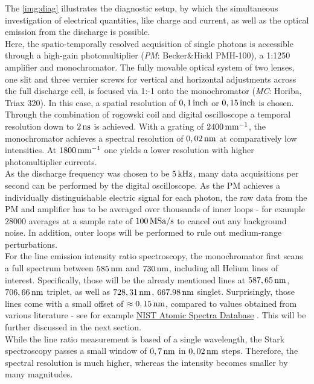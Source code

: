 \documentclass[a4paper,10pt,twoside]{article}
\newcommand{\tilt}[1]{\textit{#1}}
\begin{document}
			The \autoref{img:diag} illustrates the diagnostic setup, by which the simultaneous investigation of electrical quantities, like charge and current, as well as the optical emission from the discharge is possible.\\		Here, the spatio-temporally resolved acquisition of single photons is accessible through a high-gain photomultiplier (\tilt{PM}: Becker\&Hickl PMH-100), a 1:1250 amplifier and monochromator. The fully movable optical system of two lenses, one slit and three vernier screws for vertical and horizontal adjustments across the full discharge cell, is focused via 1:-1 onto the monochromator (\tilt{MC}: Horiba, Triax 320). In this case, a spatial resolution of $\unit[0,1]{inch}$ or $\unit[0,15]{inch}$ is chosen. Through the combination of rogowski coil and digital oscilloscope a temporal resolution down to $\unit[2]{ns}$ is achieved. With a grating of $\unit[2400]{mm^{-1}}$, the monochromator achieves a spectral resolution of $\unit[0,02]{nm}$ at comparatively low intensities. At $\unit[1800]{mm^{-1}}$ one yields a lower resolution with higher photomultiplier currents.\\
			As the discharge frequency was chosen to be $\unit[5]{kHz}$, many data acquisitions per second can be performed by the digital oscilloscope. As the PM achieves a individually distinguishable electric signal for each photon, the raw data from the PM and amplifier has to be averaged over thousands of inner loops - for example 28000 averages at a sample rate of $\unit[100]{MSa/s}$ to cancel out any background noise. In addition, outer loops will be performed to rule out medium-range perturbations.\\
			For the line emission intensity ratio spectroscopy, the monochromator first scans a full spectrum between $\unit[585]{nm}$ and $\unit[730]{nm}$, including all Helium lines of interest. Specifically, those will be the already mentioned lines at $\unit[587,65]{nm}$, $\unit[706,66]{nm}$ triplet, as well as $\unit[728,31]{nm}$, $\unit[667.98]{nm}$ singlet. Surprisingly, those lines come with a small offset of $\approx\unit[0,15]{nm}$, compared to values obtained from various literature - see for example \href{http://www.nist.gov/pml/data/asd.cfm}{NIST Atomic Spectra Database} \cite{NIST_ASD}. This will be further discussed in the next section.\\
			While the line ratio measurement is based of a single wavelength, the Stark spectroscopy passes a small window of $\unit[0,7]{nm}$ in $\unit[0,02]{nm}$ steps. Therefore, the spectral resolution is much higher, whereas the intensity becomes smaller by many magnitudes.\\
\end{document}
